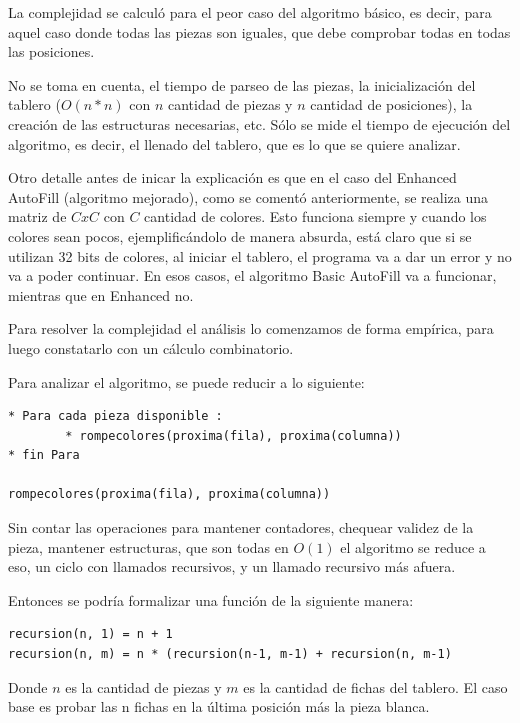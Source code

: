 \documentclass[11pt,a4paper]{article}
\begin{document}
La complejidad se calculó para el peor caso del algoritmo básico, es decir, para aquel caso donde todas las piezas son iguales, que debe comprobar todas en todas las posiciones.

No se toma en cuenta, el tiempo de parseo de las piezas, la inicialización del tablero ($O(n*n)$ con $n$ cantidad de piezas y $n$ cantidad de posiciones), la creación de las estructuras necesarias, etc. Sólo se mide el tiempo de ejecución del algoritmo, es decir, el llenado del tablero, que es lo que se quiere analizar.

Otro detalle antes de inicar la explicación es que en el caso del Enhanced AutoFill (algoritmo mejorado), como se comentó anteriormente, se realiza una matriz de $CxC$ con $C$ cantidad de colores. Esto funciona siempre y cuando los colores sean pocos, ejemplificándolo de manera absurda, está claro que si se utilizan 32 bits de colores, al iniciar el tablero, el programa va a dar un error y no va a poder continuar. En esos casos, el algoritmo Basic AutoFill va a funcionar, mientras que en Enhanced no.

Para resolver la complejidad el análisis lo comenzamos de forma empírica, para luego constatarlo con un cálculo combinatorio.

Para analizar el algoritmo, se puede reducir a lo siguiente:

\begin{Verbatim}[commandchars=\\\{\}]
* Para cada pieza disponible :
		* rompecolores(proxima(fila), proxima(columna))
* fin Para
	
rompecolores(proxima(fila), proxima(columna))
\end{Verbatim}

Sin contar las operaciones para mantener contadores, chequear validez de la pieza, mantener estructuras, que son todas en $O(1)$ el algoritmo se reduce a eso, un ciclo con llamados recursivos, y un llamado recursivo más afuera.

Entonces se podría formalizar una función de la siguiente manera:

\begin{Verbatim}[commandchars=\\\{\}]
recursion(n, 1) = n + 1
recursion(n, m) = n * (recursion(n-1, m-1) + recursion(n, m-1)
\end{Verbatim}

Donde $n$ es la cantidad de piezas y $m$ es la cantidad de fichas del tablero. El caso base es probar las n fichas en la última posición más la pieza blanca.
\end{document}
